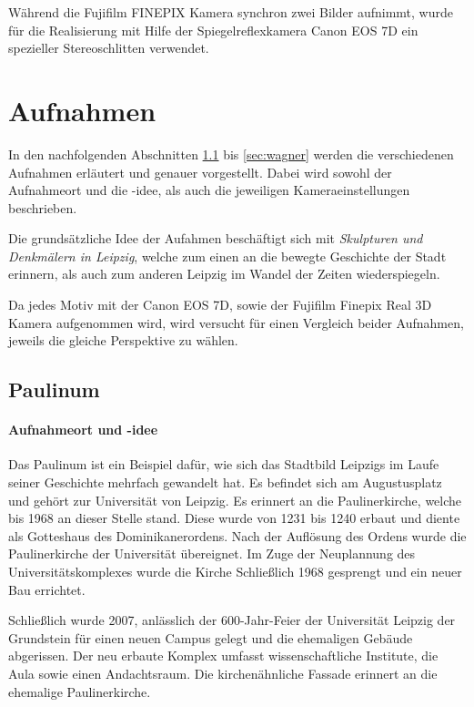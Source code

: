 \documentclass[liststotoc,bibtotoc,fontsize=14pt,]{scrreprt}
\begin{document}
	Während die Fujifilm FINEPIX Kamera synchron zwei Bilder aufnimmt, wurde für die Realisierung mit Hilfe der Spiegelreflexkamera Canon EOS 7D ein spezieller Stereoschlitten verwendet. 
	
			
	\chapter{Aufnahmen}
	\label{ch:aufnahmen}
	In den nachfolgenden Abschnitten \ref{sec:paulinum} bis \ref{sec:wagner} werden die verschiedenen Aufnahmen erläutert und genauer vorgestellt. Dabei wird sowohl der Aufnahmeort und die -idee, als auch die jeweiligen Kameraeinstellungen beschrieben. 
	
	\bigskip
	Die grundsätzliche Idee der Aufahmen beschäftigt sich mit \textit{Skulpturen und Denkmälern in Leipzig}, welche zum einen an die bewegte Geschichte der Stadt erinnern, als auch zum anderen Leipzig im Wandel der Zeiten wiederspiegeln.
	
	\bigskip
	Da jedes Motiv mit der Canon EOS 7D, sowie der Fujifilm Finepix Real 3D Kamera aufgenommen wird, wird versucht für einen Vergleich beider Aufnahmen, jeweils die gleiche Perspektive zu wählen. 
	
	\section{Paulinum }
	\label{sec:paulinum}
	\subsubsection{Aufnahmeort und -idee}
		Das Paulinum ist ein Beispiel dafür, wie sich das Stadtbild Leipzigs im Laufe seiner Geschichte mehrfach gewandelt hat. Es befindet sich am Augustusplatz und gehört zur Universität von Leipzig. Es erinnert an die Paulinerkirche, welche bis 1968 an dieser Stelle stand. Diese wurde von 1231 bis 1240 erbaut und diente als Gotteshaus des Dominikanerordens. Nach der Auflösung des Ordens wurde die Paulinerkirche der Universität übereignet. Im Zuge der Neuplannung des Universitätskomplexes wurde die Kirche Schließlich 1968 gesprengt und ein neuer Bau errichtet. 
		
		\bigskip
		Schließlich wurde 2007, anlässlich der 600-Jahr-Feier der Universität Leipzig der Grundstein für einen neuen Campus gelegt und die ehemaligen Gebäude abgerissen. Der neu erbaute Komplex umfasst wissenschaftliche Institute, die Aula sowie einen Andachtsraum. Die kirchenähnliche Fassade erinnert an die ehemalige Paulinerkirche. 
		
\end{document}
